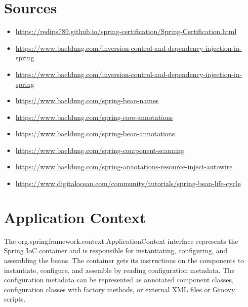 \documentclass{scrartcl}
\begin{document}

\section{Sources}

\begin{itemize}
    \item \url{https://redips789.github.io/spring-certification/Spring-Certification.html}
    \item \url{https://www.baeldung.com/inversion-control-and-dependency-injection-in-spring}
    \item \url{https://www.baeldung.com/inversion-control-and-dependency-injection-in-spring}


    \item \url{https://www.baeldung.com/spring-bean-names}
    \item \url{https://www.baeldung.com/spring-core-annotations}
    \item \url{https://www.baeldung.com/spring-bean-annotations}
    \item \url{https://www.baeldung.com/spring-component-scanning}
    \item \url{https://www.baeldung.com/spring-annotations-resource-inject-autowire}
    \item \url{https://www.digitalocean.com/community/tutorials/spring-bean-life-cycle}
\end{itemize}


\section{Application Context}

The org.springframework.context.ApplicationContext interface represents the Spring IoC container and is responsible for instantiating, configuring, and assembling the beans. The container gets its instructions on the components to instantiate, configure, and assemble by reading configuration metadata. The configuration metadata can be represented as annotated component classes, configuration classes with factory methods, or external XML files or Groovy scripts.
\end{document}
